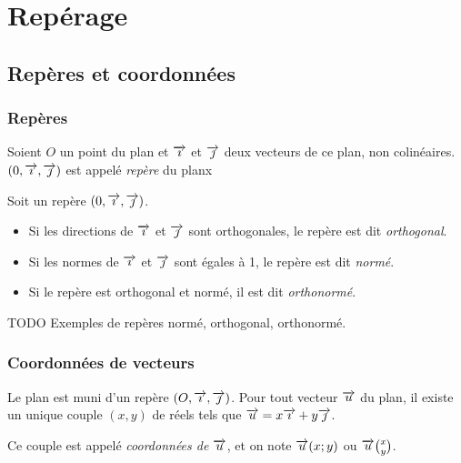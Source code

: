 \chapter{Repérage}
\section{Repères et coordonnées}

\subsection{Repères}

\begin{definition}
  Soient $O$ un point du plan et $\overrightarrow{\imath}$ et $\overrightarrow{\jmath}$ deux vecteurs de ce plan, non colinéaires. $(0, \overrightarrow{\imath}, \overrightarrow{\jmath})$ est appelé \emph{repère} du planx
\end{definition}

\begin{definition}Soit un repère $(0, \overrightarrow{\imath}, \overrightarrow{\jmath})$.
  \begin{itemize}
    \item Si les directions de $\overrightarrow{\imath}$ et $\overrightarrow{\jmath}$ sont orthogonales, le repère est dit \emph{orthogonal}.
    \item Si les normes de $\overrightarrow{\imath}$ et $\overrightarrow{\jmath}$ sont égales à 1, le repère est dit \emph{normé}.
    \item Si le repère est orthogonal et normé, il est dit \emph{orthonormé}.
  \end{itemize}
\end{definition}

\begin{exemple}TODO Exemples de repères normé, orthogonal, orthonormé.
\end{exemple}

\subsection{Coordonnées de vecteurs}

\begin{definition}
  Le plan est muni d'un repère $(O, \overrightarrow{\imath},
  \overrightarrow{\jmath})$. Pour tout vecteur $\overrightarrow{u}$ du plan, il existe un unique
  couple $(x,y)$ de réels tels que $\overrightarrow{u}=x\overrightarrow{\imath}+y\overrightarrow{\jmath}$.

Ce couple est appelé \emph{coordonnées de $\overrightarrow{u}$}, et on note
$\overrightarrow{u}(x;y)$ ou
$\overrightarrow{u}\binom{x}{y}$.
\end{definition}

